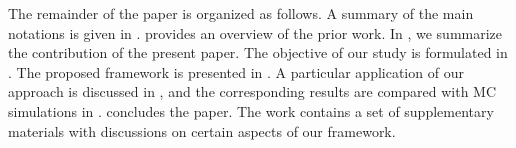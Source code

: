 The remainder of the paper is organized as follows.
A summary of the main notations is given in .
 provides an overview of the prior work.
In , we summarize the contribution of the present paper.
The objective of our study is formulated in .
The proposed framework is presented in .
A particular application of our approach is discussed in , and the corresponding results are compared with MC simulations in .
 concludes the paper.
The work contains a set of supplementary materials with discussions on certain aspects of our framework.
